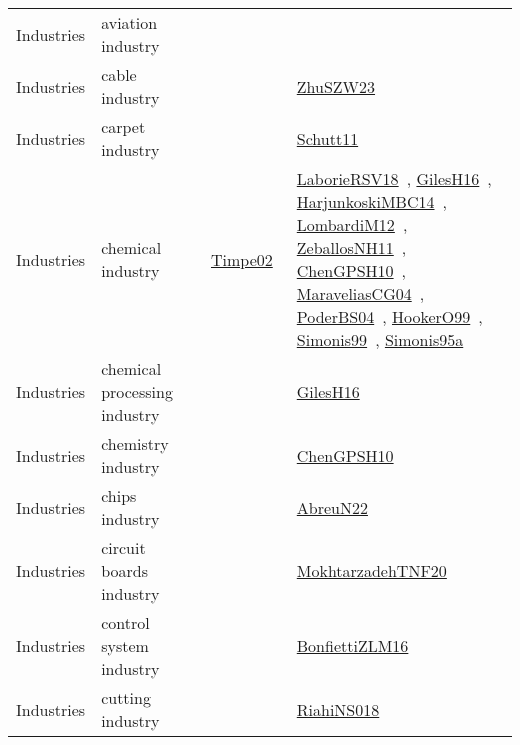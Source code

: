 {\begin{longtable}{lp{3cm}>{\raggedright\arraybackslash}p{6cm}>{\raggedright\arraybackslash}p{6cm}>{\raggedright\arraybackslash}p{8cm}}
\index{aviation industry}\index{Industries!aviation industry}Industries & aviation industry &  &  & \\
\index{cable industry}\index{Industries!cable industry}Industries & cable industry &  &  & \href{../works/ZhuSZW23.pdf}{ZhuSZW23}~\cite{ZhuSZW23}\\
\index{carpet industry}\index{Industries!carpet industry}Industries & carpet industry &  &  & \href{../works/Schutt11.pdf}{Schutt11}~\cite{Schutt11}\\
\index{chemical industry}\index{Industries!chemical industry}Industries & chemical industry &  & \href{../works/Timpe02.pdf}{Timpe02}~\cite{Timpe02} & \href{../works/LaborieRSV18.pdf}{LaborieRSV18}~\cite{LaborieRSV18}, \href{../works/GilesH16.pdf}{GilesH16}~\cite{GilesH16}, \href{../works/HarjunkoskiMBC14.pdf}{HarjunkoskiMBC14}~\cite{HarjunkoskiMBC14}, \href{../works/LombardiM12.pdf}{LombardiM12}~\cite{LombardiM12}, \href{../works/ZeballosNH11.pdf}{ZeballosNH11}~\cite{ZeballosNH11}, \href{../works/ChenGPSH10.pdf}{ChenGPSH10}~\cite{ChenGPSH10}, \href{../works/MaraveliasCG04.pdf}{MaraveliasCG04}~\cite{MaraveliasCG04}, \href{../works/PoderBS04.pdf}{PoderBS04}~\cite{PoderBS04}, \href{../works/HookerO99.pdf}{HookerO99}~\cite{HookerO99}, \href{../works/Simonis99.pdf}{Simonis99}~\cite{Simonis99}, \href{../works/Simonis95a.pdf}{Simonis95a}~\cite{Simonis95a}\\
\index{chemical processing industry}\index{Industries!chemical processing industry}Industries & chemical processing industry &  &  & \href{../works/GilesH16.pdf}{GilesH16}~\cite{GilesH16}\\
\index{chemistry industry}\index{Industries!chemistry industry}Industries & chemistry industry &  &  & \href{../works/ChenGPSH10.pdf}{ChenGPSH10}~\cite{ChenGPSH10}\\
\index{chips industry}\index{Industries!chips industry}Industries & chips industry &  &  & \href{../works/AbreuN22.pdf}{AbreuN22}~\cite{AbreuN22}\\
\index{circuit boards industry}\index{Industries!circuit boards industry}Industries & circuit boards industry &  &  & \href{../works/MokhtarzadehTNF20.pdf}{MokhtarzadehTNF20}~\cite{MokhtarzadehTNF20}\\
\index{control system industry}\index{Industries!control system industry}Industries & control system industry &  &  & \href{../works/BonfiettiZLM16.pdf}{BonfiettiZLM16}~\cite{BonfiettiZLM16}\\
\index{cutting industry}\index{Industries!cutting industry}Industries & cutting industry &  &  & \href{../works/RiahiNS018.pdf}{RiahiNS018}~\cite{RiahiNS018}\\

\end{longtable}}
